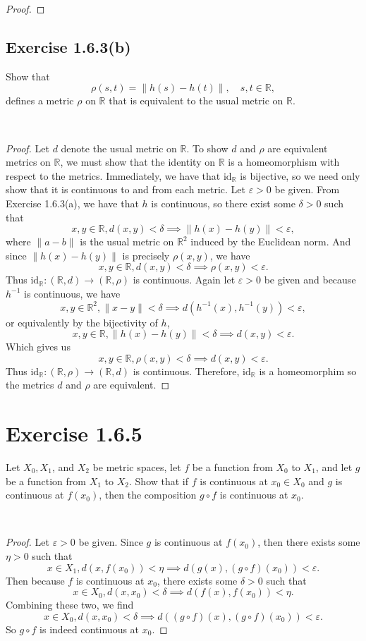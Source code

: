 \documentclass[12pt]{article}
\newcommand{\R}{\mathbb{R}}
\newcommand{\eps}{\varepsilon}
\newcommand{\id}{\text{id}}
\newenvironment{problem}
    {\begin{lrbox}{\mybox}\begin{minipage}{\textwidth-10pt}}
    {\end{minipage}\end{lrbox}\framebox[6.5in]{\usebox{\mybox}}\\}
\begin{document}
\begin{proof}
\end{proof}

\subsection*{Exercise 1.6.3(b)}
\begin{problem}
    Show that
    \[\rho(s,t) = \|h(s)-h(t)\|, \quad s,t\in\R,\]
    defines a metric $\rho$ on $\R$ that is equivalent to the usual metric on $\R$.
\end{problem}

\begin{proof}
    Let $d$ denote the usual metric on $\R$. To show $d$ and $\rho$ are equivalent metrics on $\R$, we must show that the identity on $\R$ is a homeomorphism with respect to the metrics. Immediately, we have that $\id_\R$ is bijective, so we need only show that it is continuous to and from each metric. Let $\eps>0$ be given. From Exercise 1.6.3(a), we have that $h$ is continuous, so there exist some $\delta>0$ such that
    \[x,y\in\R, d(x,y)<\delta \implies \|h(x) - h(y)\|<\eps,\]
    where $\|a-b\|$ is the usual metric on $\R^2$ induced by the Euclidean norm. And since $\|h(x)-h(y)\|$ is precisely $\rho(x,y)$, we have
    \[x,y\in\R, d(x,y)<\delta \implies \rho(x,y)<\eps.\]
    Thus $\id_\R:(\R,d)\to(\R,\rho)$ is continuous. Again let $\eps>0$ be given and because $h^{-1}$ is continuous, we have
    \[x,y\in\R^2, \|x-y\|<\delta \implies d(h^{-1}(x),h^{-1}(y))<\eps,\]
    or equivalently by the bijectivity of $h$,
    \[x,y\in\R, \|h(x) - h(y)\|<\delta \implies d(x,y)<\eps.\]
    Which gives us
    \[x,y\in\R, \rho(x,y)<\delta \implies d(x,y)<\eps.\]
    Thus $\id_\R:(\R,\rho)\to(\R,d)$ is continuous. Therefore, $\id_\R$ is a homeomorphim so the metrics $d$ and $\rho$ are equivalent.
    
\end{proof}

\section*{Exercise 1.6.5}
\begin{problem}
    Let $X_0,X_1$, and $X_2$ be metric spaces, let $f$ be a function from $X_0$ to $X_1$, and let $g$ be a function from $X_1$ to $X_2$. Show that if $f$ is continuous at $x_0\in X_0$ and $g$ is continuous at $f(x_0)$, then the composition $g\circ f$ is continuous at $x_0$.
\end{problem}

\begin{proof}
    Let $\eps>0$ be given. Since $g$ is continuous at $f(x_0)$, then there exists some $\eta>0$ such that
    \[x\in X_1, d(x,f(x_0))< \eta \implies d(g(x), (g\circ f)(x_0))<\eps.\]
    Then because $f$ is continuous at $x_0$, there exists some $\delta>0$ such that
    \[x\in X_0, d(x,x_0)<\delta \implies d(f(x), f(x_0))<\eta.\]
    Combining these two, we find
    \[x\in X_0, d(x,x_0)<\delta \implies d((g\circ f)(x), (g \circ f)(x_0))<\eps.\]
    So $g\circ f$ is indeed continuous at $x_0$.
    
\end{proof}
\end{document}
